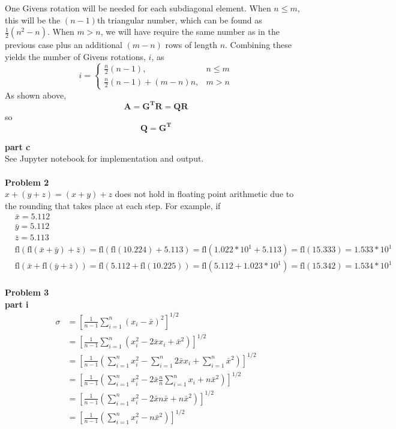 \documentclass{article} %
\begin{document}
One Givens rotation will be needed for each subdiagonal element.  When $n \leq m$, this will be the $(n-1)$th triangular number, which can be found as $\frac{1}{2}(n^2 - n)$.  When $m > n$, we will have require the same number as in the previous case plus an additional $(m-n)$ rows of length $n$.  Combining these yields the number of Givens rotations, $i$, as
\begin{equation*}
i = \left\{\begin{array}{cl}\frac{n}{2}(n-1),& n \leq m \\
			\frac{n}{2}(n-1) + (m-n)n,& m > n \end{array}\right. 
\end{equation*}
As shown above,
\begin{equation*}
\boldsymbol{A} = \boldsymbol{G^T R} = \boldsymbol{QR}
\end{equation*}
so
\begin{equation*}
\boldsymbol{Q} = \boldsymbol{G^T}
\end{equation*}

\textbf{part c} \\
See Jupyter notebook for implementation and output.
\\
\\


\textbf{Problem 2} \\
$x+(y+z)=(x+y)+z$ does not hold in floating point arithmetic due to the rounding that takes place at each step.  For example, if 
\begin{align*}
&\bar{x}=5.112 \\
&\bar{y}=5.112 \\
&\bar{z}=5.113 \\
&\mbox{fl}(\mbox{fl}(\bar{x}+\bar{y}) + \bar{z}) = \mbox{fl}(\mbox{fl}(10.224) + 5.113) = \mbox{fl}(1.022 * 10^1 + 5.113) = \mbox{fl}(15.333) = 1.533 * 10^1 \\
&\mbox{fl}(\bar{x}+\mbox{fl}(\bar{y} + \bar{z})) = \mbox{fl}(5.112 + \mbox{fl}(10.225)) = \mbox{fl}(5.112 + 1.023 * 10^1) = \mbox{fl}(15.342) = 1.534 * 10^1
\end{align*}
 \\


\textbf{Problem 3} \\
\textbf{part i} \\
\begin{align*}
\sigma &= [\frac{1}{n-1}\sum_{i=1}^n(x_i-\bar{x})^2]^{1/2} \\
  &= [\frac{1}{n-1}\sum_{i=1}^n(x_i^2-2\bar{x}x_i + \bar{x}^2)]^{1/2} \\
  &= [\frac{1}{n-1}(\sum_{i=1}^nx_i^2-\sum_{i=1}^n 2\bar{x}x_i + \sum_{i=1}^n\bar{x}^2)]^{1/2} \\
  &= [\frac{1}{n-1}(\sum_{i=1}^nx_i^2-2\bar{x}\frac{n}{n}\sum_{i=1}^n x_i + n \bar{x}^2)]^{1/2} \\
  &= [\frac{1}{n-1}(\sum_{i=1}^nx_i^2-2\bar{x}n\bar{x} + n \bar{x}^2)]^{1/2} \\
  &= [\frac{1}{n-1}(\sum_{i=1}^nx_i^2- n\bar{x}^2)]^{1/2} \\
\end{align*}
\end{document}
